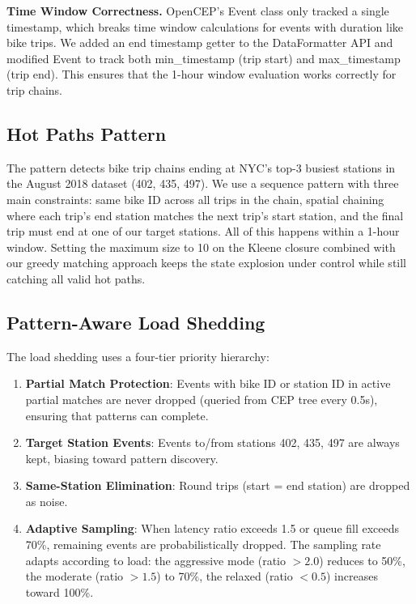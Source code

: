 \documentclass[sigconf]{acmart}
\begin{document}
\textbf{Time Window Correctness.} OpenCEP's Event class only tracked a single timestamp, which breaks time window calculations for events with duration like bike trips. We added an end timestamp getter to the DataFormatter API and modified Event to track both min\_timestamp (trip start) and max\_timestamp (trip end). This ensures that the 1-hour window evaluation works correctly for trip chains.

\subsection{Hot Paths Pattern}

The pattern detects bike trip chains ending at NYC's top-3 busiest stations in the August 2018 dataset (402, 435, 497). We use a sequence pattern with three main constraints: same bike ID across all trips in the chain, spatial chaining where each trip's end station matches the next trip's start station, and the final trip must end at one of our target stations. All of this happens within a 1-hour window. Setting the maximum size to 10 on the Kleene closure combined with our greedy matching approach keeps the state explosion under control while still catching all valid hot paths.

\subsection{Pattern-Aware Load Shedding}

The load shedding uses a four-tier priority hierarchy:
\begin{enumerate}
  \item \textbf{Partial Match Protection}: Events with bike ID or station ID in active partial matches are never dropped (queried from CEP tree every 0.5s), ensuring that patterns can complete.
  \item \textbf{Target Station Events}: Events to/from stations 402, 435, 497 are always kept, biasing toward pattern discovery.
  \item \textbf{Same-Station Elimination}: Round trips (start = end station) are dropped as noise.
  \item \textbf{Adaptive Sampling}: When latency ratio exceeds 1.5 or queue fill exceeds 70\%, remaining events are probabilistically dropped. The sampling rate adapts according to load: the aggressive mode (ratio $> 2.0$) reduces to 50\%, the moderate (ratio $> 1.5$) to 70\%, the relaxed (ratio $< 0.5$) increases toward 100\%.
\end{enumerate}
\end{document}
